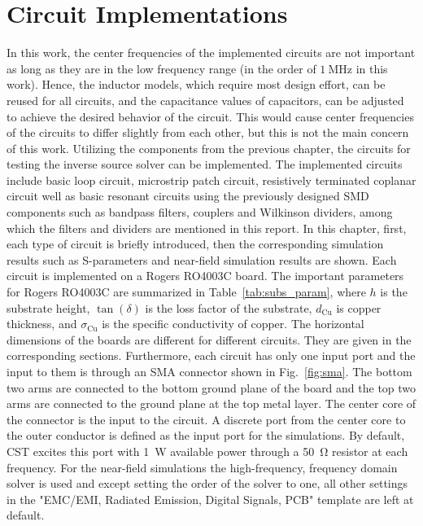 \chapter{Circuit Implementations} \label{chap:three}
In this work, the center frequencies of the implemented circuits are not important as long as they are in the low frequency range (in the order of $\SI{1}{\mega\hertz}$ in this work). Hence, the inductor models, which require most design effort, can be reused for all circuits, and the capacitance values of capacitors, can be adjusted to achieve the desired behavior of the circuit. This would cause center frequencies of the circuits to differ slightly from each other, but this is not the main concern of this work. Utilizing the components from the previous chapter, the circuits for testing the inverse source solver can be implemented. The implemented circuits include basic loop circuit, microstrip patch circuit, resistively terminated coplanar circuit well as basic resonant circuits using the previously designed SMD components such as bandpass filters, couplers and Wilkinson dividers, among which the filters and dividers are mentioned in this report. In this chapter, first, each type of circuit is briefly introduced, then the corresponding simulation results such as S-parameters and near-field simulation results are shown. Each circuit is implemented on a Rogers RO4003C board. The important parameters for Rogers RO4003C are summarized in Table~\ref{tab:subs_param}, where $h$ is the substrate height, $\tan(\delta)$ is the loss factor of the substrate, $d_\mathrm{Cu}$ is copper thickness, and $\sigma_\mathrm{Cu}$ is the specific conductivity of copper. The horizontal dimensions of the boards are different for different circuits. They are given in the corresponding sections. Furthermore, each circuit has only one input port and the input to them is through an SMA connector shown in Fig.~\ref{fig:sma}. The bottom two arms are connected to the bottom ground plane of the board and the top two arms are connected to the ground plane at the top metal layer. The center core of the connector is the input to the circuit. A discrete port from the center core to the outer conductor is defined as the input port for the simulations. By default, CST excites this port with \SI{1}{\watt} available power through a \SI{50}{\ohm} resistor at each frequency. For the near-field simulations the high-frequency, frequency domain solver is used and except setting the order of the solver to one, all other settings in the "EMC/EMI, Radiated Emission, Digital Signals, PCB" template are left at default.
